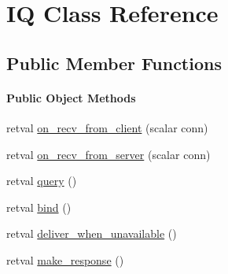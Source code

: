 \hypertarget{class_d_jabberd_1_1_i_q}{
\section{\-I\-Q \-Class \-Reference}
\label{class_d_jabberd_1_1_i_q}
}
\subsection*{\-Public \-Member \-Functions}
\begin{Indent}\paragraph*{\-Public \-Object \-Methods}
\begin{DoxyCompactItemize}
\item 
retval \hyperlink{class_d_jabberd_1_1_i_q_ae63682df867d9a59ae7096b94a14aeef}{on\-\_\-recv\-\_\-from\-\_\-client} (scalar conn)
\item 
retval \hyperlink{class_d_jabberd_1_1_i_q_ad3c4c11657fd6d051400183115faade3}{on\-\_\-recv\-\_\-from\-\_\-server} (scalar conn)
\item 
retval \hyperlink{class_d_jabberd_1_1_i_q_a0f6ed7cbd2103782548fd3cc71760f21}{query} ()
\item 
retval \hyperlink{class_d_jabberd_1_1_i_q_a75f2b4ba41577d78841b29d336e685e6}{bind} ()
\item 
retval \hyperlink{class_d_jabberd_1_1_i_q_af58a834c4971c26d4c241a4ee7ceed4c}{deliver\-\_\-when\-\_\-unavailable} ()
\item 
retval \hyperlink{class_d_jabberd_1_1_i_q_ad896f0f1f89148b00d62cc98fc4d5eaa}{make\-\_\-response} ()
\end{DoxyCompactItemize}
\end{Indent}

